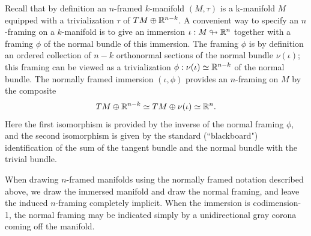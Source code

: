 \documentclass{amsart}
\begin{document}
Recall that by definition an $n$-framed $k$-manifold $(M,\tau)$ is a k-manifold $M$ equipped with a trivialization $\tau$ of $TM \oplus \mathbb R^{n-k}$.  A convenient way to specify an $n$-framing on a $k$-manifold is to give an immersion $\iota: M \looparrowright \mathbb R^n$ together with a framing $\phi$ of the normal bundle of this immersion.  The framing $\phi$ is by definition an ordered collection of $n-k$ orthonormal sections of the normal bundle $\nu(\iota)$; this framing can be viewed as a trivialization $\phi: \nu(\iota) \simeq \mathbb R^{n-k}$ of the normal bundle.  The normally framed immersion $(\iota, \phi)$ provides an $n$-framing on $M$ by the composite
\[TM \oplus \mathbb R^{n-k} \simeq TM \oplus \nu(\iota) \simeq  \mathbb R^n.\]
Here the first isomorphism is provided by the inverse of the normal framing $\phi$, and the second isomorphism is given by the standard (``blackboard") identification of the sum of the tangent bundle and the normal bundle with the trivial bundle.

When drawing $n$-framed manifolds using the normally framed notation described above, we draw the immersed manifold and draw the normal framing, and leave the induced $n$-framing completely implicit.  When the immersion is codimension-1, the normal framing may be indicated simply by a unidirectional gray corona coming off the manifold.  %
\end{document}
